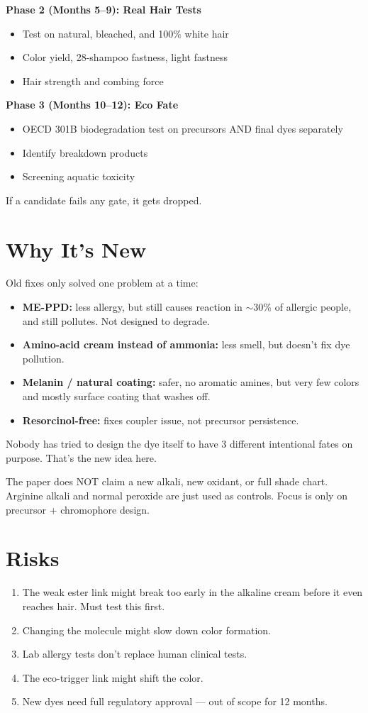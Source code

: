 \documentclass[11pt,a4paper]{article}
\begin{document}
\textbf{Phase 2 (Months 5--9): Real Hair Tests}
\begin{itemize}[leftmargin=1.5em]
\item Test on natural, bleached, and 100\% white hair
\item Color yield, 28-shampoo fastness, light fastness
\item Hair strength and combing force
\end{itemize}

\textbf{Phase 3 (Months 10--12): Eco Fate}
\begin{itemize}[leftmargin=1.5em]
\item OECD 301B biodegradation test on precursors AND final dyes separately
\item Identify breakdown products
\item Screening aquatic toxicity
\end{itemize}

If a candidate fails any gate, it gets dropped.

\section{Why It's New}
Old fixes only solved one problem at a time:
\begin{itemize}[leftmargin=1.5em]
\item \textbf{ME-PPD:} less allergy, but still causes reaction in $\sim$30\% of allergic people, and still pollutes. Not designed to degrade.
\item \textbf{Amino-acid cream instead of ammonia:} less smell, but doesn't fix dye pollution.
\item \textbf{Melanin / natural coating:} safer, no aromatic amines, but very few colors and mostly surface coating that washes off.
\item \textbf{Resorcinol-free:} fixes coupler issue, not precursor persistence.
\end{itemize}

Nobody has tried to design the dye itself to have 3 different intentional fates on purpose. That's the new idea here.

The paper does NOT claim a new alkali, new oxidant, or full shade chart. Arginine alkali and normal peroxide are just used as controls. Focus is only on precursor + chromophore design.

\section{Risks}
\begin{enumerate}[leftmargin=1.5em]
\item The weak ester link might break too early in the alkaline cream before it even reaches hair. Must test this first.
\item Changing the molecule might slow down color formation.
\item Lab allergy tests don't replace human clinical tests.
\item The eco-trigger link might shift the color.
\item New dyes need full regulatory approval --- out of scope for 12 months.
\end{enumerate}
\end{document}

